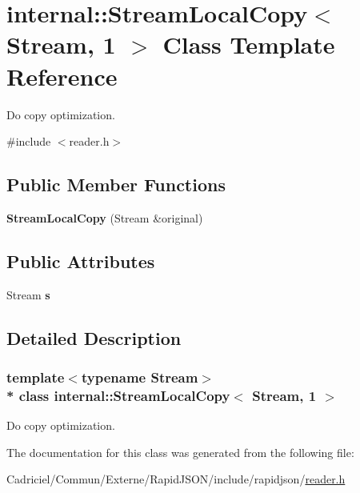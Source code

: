 \hypertarget{classinternal_1_1_stream_local_copy_3_01_stream_00_011_01_4}{}\section{internal\+:\+:Stream\+Local\+Copy$<$ Stream, 1 $>$ Class Template Reference}
\label{classinternal_1_1_stream_local_copy_3_01_stream_00_011_01_4}


Do copy optimization.  




{\ttfamily \#include $<$reader.\+h$>$}

\subsection*{Public Member Functions}
\begin{DoxyCompactItemize}
\item 
{\bfseries Stream\+Local\+Copy} (Stream \&original)\hypertarget{classinternal_1_1_stream_local_copy_3_01_stream_00_011_01_4_aba475fed3eecc9f77ff059fdb7fe2a32}{}\label{classinternal_1_1_stream_local_copy_3_01_stream_00_011_01_4_aba475fed3eecc9f77ff059fdb7fe2a32}

\end{DoxyCompactItemize}
\subsection*{Public Attributes}
\begin{DoxyCompactItemize}
\item 
Stream {\bfseries s}\hypertarget{classinternal_1_1_stream_local_copy_3_01_stream_00_011_01_4_a1d3e8ae8756325df25715d4ffb9c1b44}{}\label{classinternal_1_1_stream_local_copy_3_01_stream_00_011_01_4_a1d3e8ae8756325df25715d4ffb9c1b44}

\end{DoxyCompactItemize}


\subsection{Detailed Description}
\subsubsection*{template$<$typename Stream$>$\\*
class internal\+::\+Stream\+Local\+Copy$<$ Stream, 1 $>$}

Do copy optimization. 

The documentation for this class was generated from the following file\+:\begin{DoxyCompactItemize}
\item 
Cadriciel/\+Commun/\+Externe/\+Rapid\+J\+S\+O\+N/include/rapidjson/\hyperlink{reader_8h}{reader.\+h}\end{DoxyCompactItemize}
